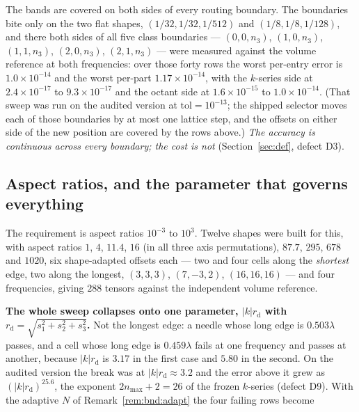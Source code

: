 The bands are covered on both sides of every routing boundary. The boundaries bite only on
the two flat shapes, $(1/32,1/32,1/512)$ and $(1/8,1/8,1/128)$, and there both sides of all
five class boundaries --- $(0,0,n_3)$, $(1,0,n_3)$, $(1,1,n_3)$, $(2,0,n_3)$, $(2,1,n_3)$
--- were measured against the volume reference at both frequencies: over those forty rows
the worst per-entry error is $1.0\times10^{-14}$ and the worst per-part
$1.17\times10^{-14}$, with the $k$-series side at $2.4\times10^{-17}$ to
$9.3\times10^{-17}$ and the octant side at $1.6\times10^{-15}$ to $1.0\times10^{-14}$.
(That sweep was run on the audited version at $\mathrm{tol} = 10^{-13}$; the shipped
selector moves each of those boundaries by at most one lattice step, and the offsets on
either side of the new position are covered by the rows above.) \emph{The accuracy is
continuous across every boundary; the cost is not} (Section~\ref{sec:def}, defect D3).

\subsection{Aspect ratios, and the parameter that governs everything}
\label{sec:ver:asp}

The requirement is aspect ratios $10^{-3}$ to $10^{3}$. Twelve shapes were built for this,
with aspect ratios $1$, $4$, $11.4$, $16$ (in all three axis permutations), $87.7$, $295$,
$678$ and $1020$, six shape-adapted offsets each --- two and four cells along the
\emph{shortest} edge, two along the longest, $(3,3,3)$, $(7,-3,2)$, $(16,16,16)$ --- and
four frequencies, giving $288$ tensors against the independent volume reference.

\textbf{The whole sweep collapses onto one parameter, $|k|r_{\mathrm{d}}$ with
$r_{\mathrm{d}} = \sqrt{s_1^2+s_2^2+s_3^2}$.} Not the longest edge: a needle whose long edge
is $0.503\lambda$ passes, and a cell whose long edge is $0.459\lambda$ fails at one
frequency and passes at another, because $|k|r_{\mathrm{d}}$ is $3.17$ in the first case and
$5.80$ in the second. On the audited version the break was at $|k|r_{\mathrm{d}} \approx 3.2$
and the error above it grew as $(|k|r_{\mathrm{d}})^{25.6}$, the exponent
$2n_{\max}+2 = 26$ of the frozen $k$-series (defect D9). With the adaptive $N$ of
Remark~\ref{rem:bnd:adapt} the four failing rows become

